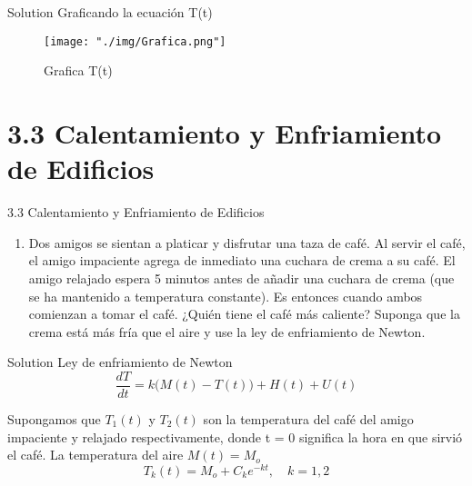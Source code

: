 \documentclass[10 pt]{beamer}
\begin{document}
\begin{frame}
    \begin{block}{Solution}
        Graficando la ecuación T(t)
        \begin{figure}[H]
            \vspace*{0.2cm}
            \centering
            \texttt{[image: "./img/Grafica.png"]}
            \caption{Grafica T(t)}
            \label{Grafica 1}
        \end{figure}
    \end{block}
\end{frame}

\setcounter{equation}{0}

\section{3.3 Calentamiento y Enfriamiento de Edificios}
\begin{frame}{3.3 Calentamiento y Enfriamiento de Edificios}
    \begin{enumerate}[{12}]
        \item Dos amigos se sientan a platicar y disfrutar una taza de café. Al servir el café, el amigo impaciente agrega de inmediato una cuchara de crema a su café. El amigo relajado espera 5 minutos antes de añadir una cuchara de crema (que se ha mantenido a temperatura constante). Es entonces cuando ambos comienzan a tomar el café. ¿Quién tiene el café más caliente? Suponga que la crema está más fría que el aire y use la ley de enfriamiento de Newton.
    \end{enumerate}

    \begin{block}{Solution}
        Ley de enfriamiento de Newton
        \begin{equation}
            \dfrac{dT}{dt} = k \bigg( M(t) - T(t) \bigg) + H(t) + U(t)
        \end{equation}

        Supongamos que $T_1(t)$ y $T_2(t)$ son la temperatura del café del amigo impaciente y relajado respectivamente, donde t = 0 significa la hora en que sirvió el café. La temperatura del aire $M(t) = M_o$
        \begin{equation}
            T_k(t) = M_o + C_ke^{-kt},\quad k = 1,2
        \end{equation}
    \end{block}
\end{frame}
\end{document}
